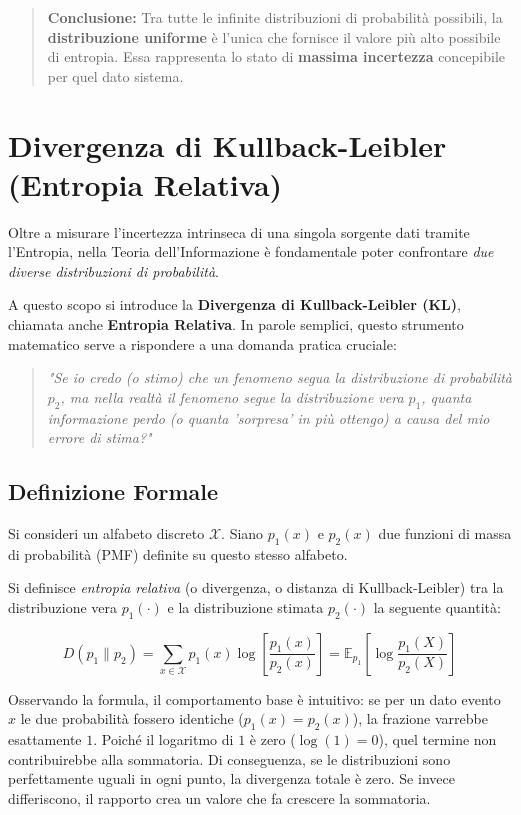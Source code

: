 \begin{quote}
\textbf{Conclusione:} Tra tutte le infinite distribuzioni di probabilità possibili, la \textbf{distribuzione uniforme} è l'unica che fornisce il valore più alto possibile di entropia. Essa rappresenta lo stato di \textbf{massima incertezza} concepibile per quel dato sistema.
\end{quote}

\section{Divergenza di Kullback-Leibler (Entropia Relativa)}

Oltre a misurare l'incertezza intrinseca di una singola sorgente dati tramite l'Entropia, nella Teoria dell'Informazione è fondamentale poter confrontare \textit{due diverse distribuzioni di probabilità}. 

A questo scopo si introduce la \textbf{Divergenza di Kullback-Leibler (KL)}, chiamata anche \textbf{Entropia Relativa}. In parole semplici, questo strumento matematico serve a rispondere a una domanda pratica cruciale:
\begin{quote}
\textit{"Se io credo (o stimo) che un fenomeno segua la distribuzione di probabilità $p_2$, ma nella realtà il fenomeno segue la distribuzione vera $p_1$, quanta informazione perdo (o quanta 'sorpresa' in più ottengo) a causa del mio errore di stima?"}
\end{quote}

\subsection{Definizione Formale}

Si consideri un alfabeto discreto $\mathcal{X}$. Siano $p_1(x)$ e $p_2(x)$ due funzioni di massa di probabilità (PMF) definite su questo stesso alfabeto.

Si definisce \textit{entropia relativa} (o divergenza, o distanza di Kullback-Leibler) tra la distribuzione vera $p_1(\cdot)$ e la distribuzione stimata $p_2(\cdot)$ la seguente quantità:

\begin{equation}
\label{eq:kl_divergence}
D(p_1 \parallel p_2) = \sum_{x \in \mathcal{X}} p_1(x) \log \left[ \frac{p_1(x)}{p_2(x)} \right] = \mathbb{E}_{p_1} \left[ \log \frac{p_1(X)}{p_2(X)} \right]
\end{equation}

Osservando la formula, il comportamento base è intuitivo: se per un dato evento $x$ le due probabilità fossero identiche ($p_1(x) = p_2(x)$), la frazione varrebbe esattamente $1$. Poiché il logaritmo di $1$ è zero ($\log(1) = 0$), quel termine non contribuirebbe alla sommatoria. 
Di conseguenza, se le distribuzioni sono perfettamente uguali in ogni punto, la divergenza totale è zero. Se invece differiscono, il rapporto crea un valore che fa crescere la sommatoria.

